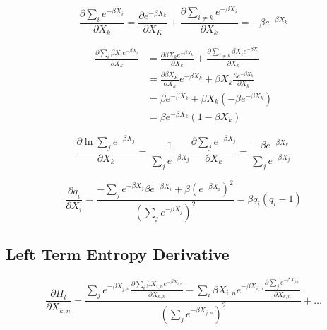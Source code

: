\begin{equation} \label{dex}
    \frac{\partial \sum_{i}e^{-\beta X_{i}}}{\partial X_{k}} = \frac{\partial e^{-\beta X_{k}}}{\partial X_{K}} + \frac{\partial \sum_{i \ne k} e^{-\beta X_{i}}}{\partial X_{k}} = -\beta e^{-\beta X_{k}}
\end{equation}

\begin{equation} \label{dxex}
\begin{aligned} 
    \frac{\partial \sum_{i}\beta X_{i} e^{-\beta X_{i}}}{\partial X_{k}} 
    &= \frac{\partial \beta X_{k} e^{-\beta X_{k}}}{\partial X_{k}} + \frac{\partial \sum_{i \ne k} \beta X_{i} e^{-\beta X_{i}}}{\partial X_{k}} \\
    &= \frac{\partial \beta X_{K}}{\partial X_{k}} e^{-\beta X_{k}} + \beta X_{k} \frac{\partial e^{-\beta X_{k}}}{\partial X_{k}}\\
    &= \beta e^{-\beta X_{k}} + \beta X_{k} (-\beta e^{-\beta X_{k}})\\
    &= \beta e^{-\beta X_{k}}(1 - \beta X_{k})
\end{aligned}
\end{equation}

\begin{equation} \label{dlne}
    \frac{\partial \ln{\sum_{j} e^{-\beta X_{j}}}}{\partial X_{k}} = \frac{1}{\sum_{j} e^{-\beta X_{j}}} \frac{\partial \sum_{j} e^{-\beta X_{j}}}{\partial X_{k}} = \frac{-\beta e^{-\beta X_{k}}}{\sum_{j}e^{-\beta X_{j}}}
\end{equation}

\begin{equation} \label{qderiv}
    \frac{\partial q_{i}}{\partial X_{i}} = \frac{-\sum_{j} e^{-\beta X_{j}} \beta e^{-\beta X_{i}} + \beta (e^{-\beta X_{i}})^2} {(\sum_{j}e^{-\beta X_{j}})^2} = \beta q_{i} \left(q_{i} - 1\right)
\end{equation}

\subsection{Left Term Entropy Derivative}


\begin{displaymath}
    \frac{\partial H_{l}}{\partial X_{k,n}} =
    \frac{\sum_{j}e^{-\beta X_{j,n}}\frac{\partial\sum_{i}\beta X_{i,n} e^{-\beta X_{i,n}}}{\partial X_{k,n}}
    - \sum_{i}\beta X_{i,n} e^{-\beta X_{i,n}}\frac{\partial\sum_{j}e^{-\beta X_{j,n}}}{\partial X_{k,n}}}{\left(\sum_{j}e^{-\beta X_{j,n}}\right)^{2}}
    + \ldots
\end{displaymath}

